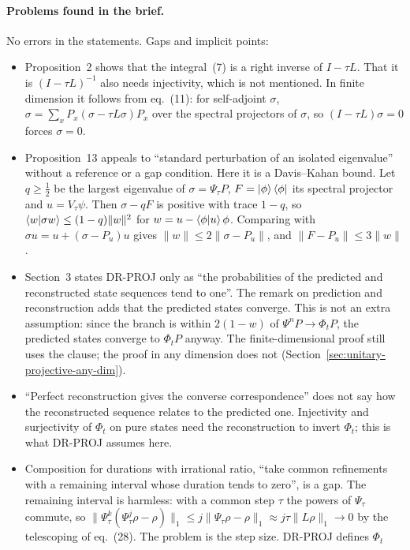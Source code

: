 \documentclass[11pt]{article}
\begin{document}
\paragraph{Problems found in the brief.} No errors in the statements. Gaps and implicit points:
\begin{itemize}
\item Proposition~2 shows that the integral~(7) is a right inverse of $I - \tau L$. That it is
  $(I - \tau L)^{-1}$ also needs injectivity, which is not mentioned. In finite dimension it
  follows from eq.~(11): for self-adjoint $\sigma$, $\sigma = \sum_x P_x(\sigma - \tau L\sigma)P_x$
  over the spectral projectors of $\sigma$, so $(I - \tau L)\sigma = 0$ forces $\sigma = 0$.
\item Proposition~13 appeals to ``standard perturbation of an isolated eigenvalue'' without a
  reference or a gap condition. Here it is a Davis--Kahan bound. Let $q \ge \frac12$ be the
  largest eigenvalue of $\sigma = \Psi_\tau P$, $F = \ket{\phi}\bra{\phi}$ its spectral projector
  and $u = V_\tau\psi$. Then $\sigma - qF$ is positive with trace $1 - q$, so
  $\braket{w|\sigma w} \le (1-q)\|w\|^2$ for $w = u - \braket{\phi|u}\phi$. Comparing with
  $\sigma u = u + (\sigma - P_u)u$ gives $\|w\| \le 2\|\sigma - P_u\|$, and
  $\|F - P_u\| \le 3\|w\|$.
\item Section~3 states DR-PROJ only as ``the probabilities of the predicted and reconstructed
  state sequences tend to one''. The remark on prediction and reconstruction adds that the
  predicted states converge. This is not an extra assumption: since the branch is within
  $2(1-w)$ of $\Psi^nP \to \Phi_tP$, the predicted states converge to $\Phi_tP$ anyway. The
  finite-dimensional proof still uses the clause; the proof in any dimension does not
  (Section~\ref{sec:unitary-projective-any-dim}).
\item ``Perfect reconstruction gives the converse correspondence'' does not say how the
  reconstructed sequence relates to the predicted one. Injectivity and surjectivity of $\Phi_t$ on
  pure states need the reconstruction to invert $\Phi_t$; this is what DR-PROJ assumes here.
\item Composition for durations with irrational ratio, ``take common refinements with a
  remaining interval whose duration tends to zero'', is a gap. The remaining interval is
  harmless: with a common step $\tau$ the powers of $\Psi_\tau$ commute, so
  $\|\Psi_\tau^k(\Psi_\tau^j\rho - \rho)\|_1 \le j\|\Psi_\tau\rho - \rho\|_1
  \approx j\tau\|L\rho\|_1
  \to 0$ by the telescoping of eq.~(28). The problem is the step size. DR-PROJ defines $\Phi_t$

\end{itemize}
\end{document}

